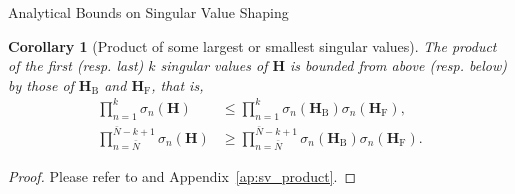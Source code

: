 \documentclass[journal]{IEEEtran}
\newtheorem{corollary}{Corollary}[proposition]
\begin{document}
\begin{section}{Analytical Bounds on Singular Value Shaping}
		\begin{corollary}[Product of some largest or smallest singular values\label{co:sv_product}]
			The product of the first (resp. last) $k$ singular values of $\mathbf{H}$ is bounded from above (resp. below) by those of $\mathbf{H}_\mathrm{B}$ and $\mathbf{H}_\mathrm{F}$, that is,
			\begin{subequations}
				\begin{align}
					\prod_{n=1}^k \sigma_n(\mathbf{H}) & \le \prod_{n=1}^k \sigma_n(\mathbf{H}_\mathrm{B}) \sigma_n(\mathbf{H}_\mathrm{F}), \label{iq:sv_product_largest} \\
					\prod_{n=\bar{N}}^{\bar{N}-k+1} \sigma_n(\mathbf{H}) & \ge \prod_{n=\bar{N}}^{\bar{N}-k+1} \sigma_n(\mathbf{H}_\mathrm{B}) \sigma_n(\mathbf{H}_\mathrm{F}). \label{iq:sv_product_smallest}
				\end{align}
			\end{subequations}
		\end{corollary}

		\begin{proof}
			Please refer to and Appendix~\ref{ap:sv_product}.
		\end{proof}


\end{section}
\end{document}
